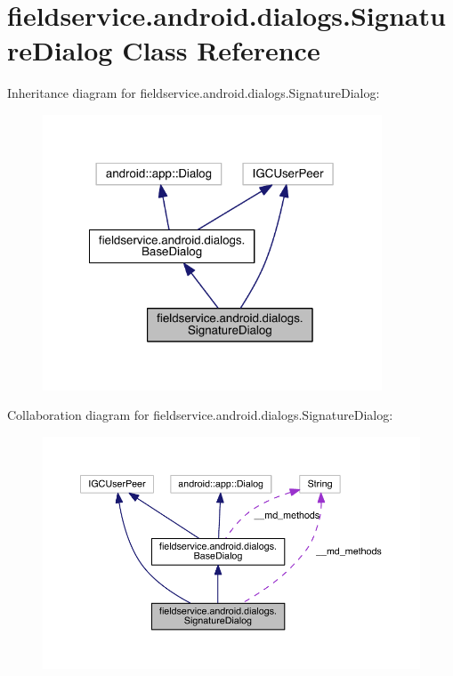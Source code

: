 \hypertarget{classfieldservice_1_1android_1_1dialogs_1_1_signature_dialog}{\section{fieldservice.\+android.\+dialogs.\+Signature\+Dialog Class Reference}
\label{classfieldservice_1_1android_1_1dialogs_1_1_signature_dialog}
}


Inheritance diagram for fieldservice.\+android.\+dialogs.\+Signature\+Dialog\+:
\nopagebreak
\begin{figure}[H]
\begin{center}
\leavevmode
\includegraphics[width=286pt]{classfieldservice_1_1android_1_1dialogs_1_1_signature_dialog__inherit__graph}
\end{center}
\end{figure}


Collaboration diagram for fieldservice.\+android.\+dialogs.\+Signature\+Dialog\+:
\nopagebreak
\begin{figure}[H]
\begin{center}
\leavevmode
\includegraphics[width=350pt]{classfieldservice_1_1android_1_1dialogs_1_1_signature_dialog__coll__graph}
\end{center}
\end{figure}
